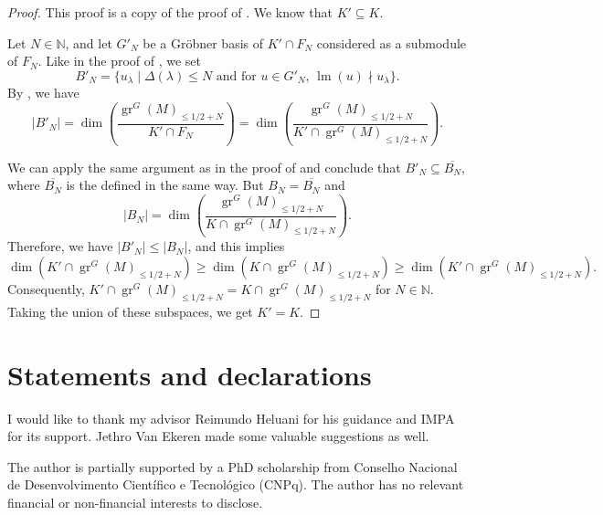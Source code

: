 \documentclass[a4paper, 12pt, reqno]{amsart}
\theoremstyle{remark}
\DeclareMathOperator{\gr}{gr}
\DeclareMathOperator{\lm}{lm}
\begin{document}
\begin{proof}
  This proof is a copy of the proof of .
  We know that $K' \subseteq K$.

  Let $N \in \mathbb{N}$, and let $G'_N$ be a Gröbner basis of $K' \cap F_N$ considered as a submodule of $F_N$.
  Like in the proof of , we set
  \begin{equation*}
    B'_N = \{u_{\lambda} \mid \text{$\Delta(\lambda) \le N$ and for $u \in G'_N$, $\lm(u) \nmid u_{\lambda}$}\}.
  \end{equation*}
  By \cite[Proposition 3.6.4]{adams_introduction_1994}, we have
  \begin{equation*}
    |B'_N| = \dim\left(\frac{\gr^G(M)_{\le 1/2 + N}}{K' \cap F_N}\right) = \dim\left(\frac{\gr^G(M)_{\le 1/2 + N}}{K' \cap \gr^G(M)_{\le 1/2 + N}}\right).
  \end{equation*}

  We can apply the same argument as in the proof of  and conclude that $B'_N \subseteq \overline{B_N}$, where $\overline{B_N}$ is the defined in the same way.
  But $B_N = \overline{B_N}$ and
  \begin{equation*}
    |B_N| = \dim\left(\frac{\gr^G(M)_{\le 1/2 + N}}{K \cap \gr^G(M)_{\le 1/2 + N}}\right).
  \end{equation*}
  Therefore, we have $|B'_N| \le |B_N|$, and this implies
  \begin{equation*}
    \dim(K' \cap \gr^G(M)_{\le 1/2 + N}) \ge \dim(K \cap \gr^G(M)_{\le 1/2 + N}) \ge \dim(K' \cap \gr^G(M)_{\le 1/2 + N}).
  \end{equation*}
  Consequently, $K' \cap \gr^G(M)_{\le 1/2 + N} = K \cap \gr^G(M)_{\le 1/2 + N}$ for $N \in \mathbb{N}$.
  Taking the union of these subspaces, we get $K' = K$.
\end{proof}

\section{Statements and declarations}
\label{sec:stat-decl}

I would like to thank my advisor Reimundo Heluani for his guidance and IMPA for its support.
Jethro Van Ekeren made some valuable suggestions as well.

The author is partially supported by a PhD scholarship from Conselho Nacional de Desenvolvimento Científico e Tecnológico (CNPq).
The author has no relevant financial or non-financial interests to disclose.
\end{document}
